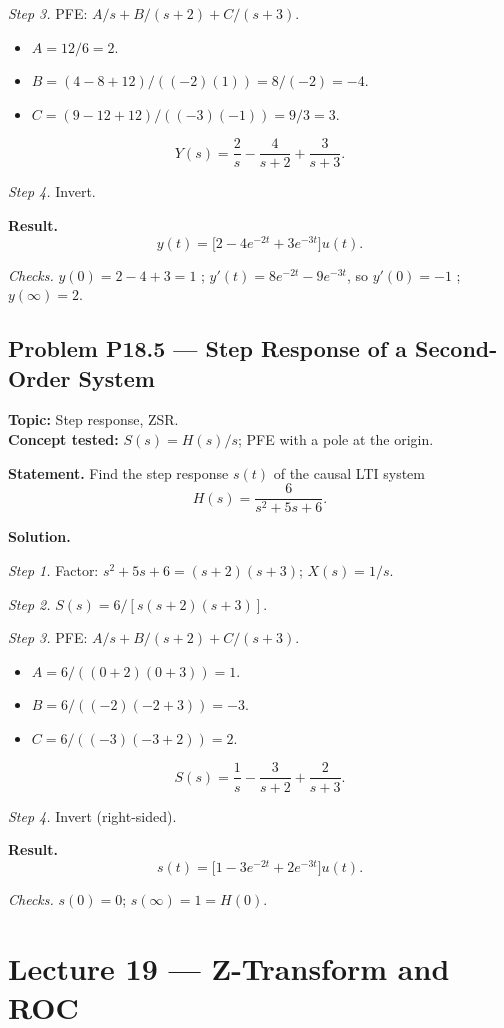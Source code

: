 \documentclass[11pt]{article}
\begin{document}
\textit{Step 3.} PFE: $A/s + B/(s+2) + C/(s+3)$.
\begin{itemize}
\item $A = 12/6 = 2$.
\item $B = (4-8+12)/((-2)(1)) = 8/(-2) = -4$.
\item $C = (9-12+12)/((-3)(-1)) = 9/3 = 3$.
\end{itemize}
\[
Y(s) = \frac{2}{s}-\frac{4}{s+2}+\frac{3}{s+3}.
\]

\textit{Step 4.} Invert.

\textbf{Result.}
\[
\boxed{\,y(t) = \bigl[2 - 4e^{-2t}+3e^{-3t}\bigr]u(t).\,}
\]

\textit{Checks.}
$y(0) = 2-4+3 = 1$ \checkmark;
$y'(t) = 8e^{-2t}-9e^{-3t}$, so $y'(0) = -1$ \checkmark;
$y(\infty) = 2$.

\subsection{Problem P18.5 --- Step Response of a Second-Order System}
\textbf{Topic:} Step response, ZSR.\\
\textbf{Concept tested:} $S(s) = H(s)/s$; PFE with a pole at the origin.

\textbf{Statement.} Find the step response $s(t)$ of the causal LTI system
\[
H(s) = \frac{6}{s^{2}+5s+6}.
\]

\textbf{Solution.}

\textit{Step 1.} Factor: $s^{2}+5s+6 = (s+2)(s+3)$; $X(s)=1/s$.

\textit{Step 2.} $S(s) = 6/[s(s+2)(s+3)]$.

\textit{Step 3.} PFE: $A/s + B/(s+2) + C/(s+3)$.
\begin{itemize}
\item $A = 6/((0+2)(0+3)) = 1$.
\item $B = 6/((-2)(-2+3)) = -3$.
\item $C = 6/((-3)(-3+2)) = 2$.
\end{itemize}
\[
S(s) = \frac{1}{s}-\frac{3}{s+2}+\frac{2}{s+3}.
\]

\textit{Step 4.} Invert (right-sided).

\textbf{Result.}
\[
\boxed{\,s(t) = \bigl[1 - 3e^{-2t} + 2e^{-3t}\bigr]u(t).\,}
\]

\textit{Checks.} $s(0) = 0$; $s(\infty) = 1 = H(0)$. \checkmark

\section{Lecture 19 --- Z-Transform and ROC}
\end{document}
